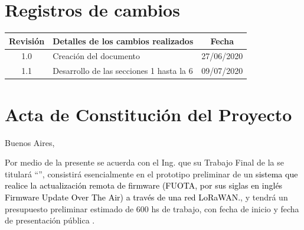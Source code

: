 \documentclass[11pt]{charter}
\begin{document}
\maketitle
\thispagestyle{empty}
\pagebreak


\thispagestyle{empty}
{\setlength{\parskip}{0pt}
\tableofcontents{}
}
\pagebreak


\section{Registros de cambios}
\label{sec:registro}


\begin{table}[ht]
\label{tab:registro}
\centering

\begin{tabularx}{\linewidth}{@{}|c|X|c|@{}}
\hline
\rowcolor[HTML]{C0C0C0} 
Revisión & \multicolumn{1}{c|}{\cellcolor[HTML]{C0C0C0}Detalles de los cambios realizados} & Fecha      \\ \hline
1.0      & Creación del documento                                                          & 27/06/2020 \\ \hline
1.1      & Desarrollo de las secciones 1 hasta la 6										   & 09/07/2020 \\ \hline
\end{tabularx}
\end{table}

\pagebreak



\section{Acta de Constitución del Proyecto}
\label{sec:acta}

\begin{flushright}
Buenos Aires, \fechaInicioName
\end{flushright}

\vspace{2cm}

Por medio de la presente se acuerda con el Ing. \authorname\hspace{1px} que su Trabajo Final de la \degreename\hspace{1px} se titulará ``\ttitle'', consistirá esencialmente en el prototipo preliminar de un \textcolor{black}{sistema que realice la actualización remota de firmware (FUOTA, por sus siglas en inglés Firmware Update Over The Air) a través de una red LoRaWAN.}, y tendrá un presupuesto preliminar estimado de 600 hs de trabajo, con fecha de inicio \fechaInicioName\hspace{1px} y fecha de presentación pública \fechaFinalName.
\end{document}

